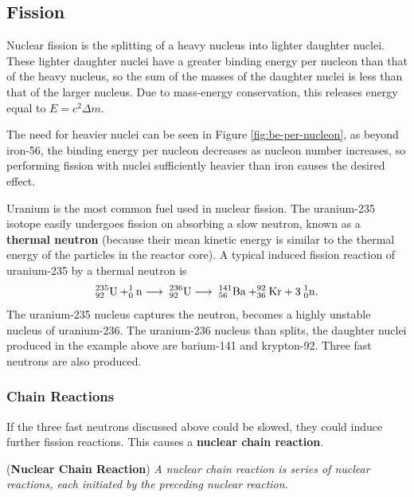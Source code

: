 \subsection{Fission}
Nuclear fission is the splitting of a heavy nucleus into lighter daughter nuclei. These lighter daughter nuclei have a greater binding energy per nucleon than that of the heavy nucleus, so the sum of the masses of the daughter nuclei is less than that of the larger nucleus. Due to mass-energy conservation, this releases energy equal to \(E = c^2 \Delta m\). 

The need for heavier nuclei can be seen in Figure \ref{fig:be-per-nucleon}, as beyond iron-56, the binding energy per nucleon decreases as nucleon number increases, so performing fission with nuclei sufficiently heavier than iron causes the desired effect.  

Uranium is the most common fuel used in nuclear fission. The uranium-235 isotope easily undergoes fission on absorbing a slow neutron, known as a \textbf{thermal neutron} (because their mean kinetic energy is similar to the thermal energy of the particles in the reactor core). A typical induced fission reaction of uranium-235 by a thermal neutron is
\begin{equation}
    _{92}^{235}\text{U} + _0^1\text{n} \longrightarrow \hspace{1mm} _{92}^{236}\text{U} \longrightarrow \hspace{1mm} _{56}^{141}\text{Ba} + _{36}^{92}\text{Kr} + 3 \hspace{1mm} _{0}^1\text{n}.
\end{equation}
The uranium-235 nucleus captures the neutron, becomes a highly unstable nucleus of uranium-236. The uranium-236 nucleus than splits, the daughter nuclei produced in the example above are barium-141 and krypton-92. Three fast neutrons are also produced. 

\subsubsection*{Chain Reactions}

If the three fast neutrons discussed above could be slowed, they could induce further fission reactions. This causes a \textbf{nuclear chain reaction}.

\begin{definition}{(\textbf{Nuclear Chain Reaction})}
\textit{A nuclear chain reaction is series of nuclear reactions, each initiated by the preceding nuclear reaction.}
\end{definition}

